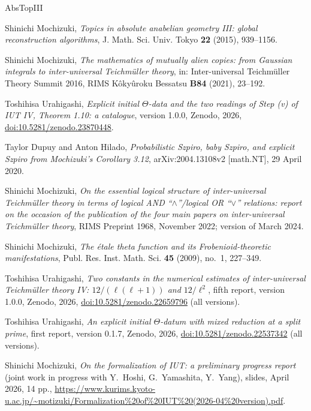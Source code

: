\documentclass[11pt,a4paper]{article}
\begin{document}
\begin{thebibliography}{AbsTopIII}\raggedright
{}
Shinichi Mochizuki, \emph{Topics in absolute anabelian geometry {III}: global reconstruction algorithms}, J. Math. Sci.
Univ. Tokyo \textbf{22} (2015), 939--1156.

Shinichi Mochizuki, \emph{The mathematics of mutually alien copies: from {G}aussian integrals to inter-universal
{T}eichm\"uller theory}, in: Inter-universal Teichm\"uller Theory Summit 2016, RIMS K\^oky\^uroku Bessatsu \textbf{B84}
(2021), 23--192.

Toshihisa Urahigashi, \emph{Explicit initial $\Theta$-data and the two readings of Step (v) of IUT IV, Theorem 1.10:
a catalogue}, version 1.0.0, Zenodo, 2026, \href{https://doi.org/10.5281/zenodo.23870448}{doi:10.5281/zenodo.23870448}.

Taylor Dupuy and Anton Hilado, \emph{Probabilistic {S}zpiro, baby {S}zpiro, and explicit {S}zpiro from {M}ochizuki's
{C}orollary 3.12}, arXiv:2004.13108v2 [math.NT], 29 April 2020.

Shinichi Mochizuki, \emph{On the essential logical structure of inter-universal {T}eichm\"uller theory in terms of
logical {AND} ``$\wedge$''/logical {OR} ``$\vee$'' relations: report on the occasion of the publication of the four main
papers on inter-universal {T}eichm\"uller theory}, RIMS Preprint 1968, November 2022; version of March 2024.

Shinichi Mochizuki, \emph{The \'etale theta function and its {F}robenioid-theoretic manifestations}, Publ. Res. Inst.
Math. Sci. \textbf{45} (2009), no.~1, 227--349.

Toshihisa Urahigashi, \emph{Two constants in the numerical estimates of inter-universal {T}eichm\"uller theory {IV}:
$12/(\ell(\ell+1))$ and $12/\ell^2$}, fifth report, version 1.0.0, Zenodo, 2026,
\href{https://doi.org/10.5281/zenodo.22659796}{doi:10.5281/zenodo.22659796} (all versions).

Toshihisa Urahigashi, \emph{An explicit initial $\Theta$-datum with mixed reduction at a split prime}, first report,
version 0.1.7, Zenodo, 2026, \href{https://doi.org/10.5281/zenodo.22537342}{doi:10.5281/zenodo.22537342} (all
versions).

Shinichi Mochizuki, \emph{On the formalization of IUT: a preliminary progress report} (joint work in progress with
Y.~Hoshi, G.~Yamashita, Y.~Yang), slides, April 2026, 14 pp.,
\url{https://www.kurims.kyoto-u.ac.jp/~motizuki/Formalization\%20of\%20IUT\%20(2026-04\%20version).pdf}.


\end{thebibliography}
\end{document}
